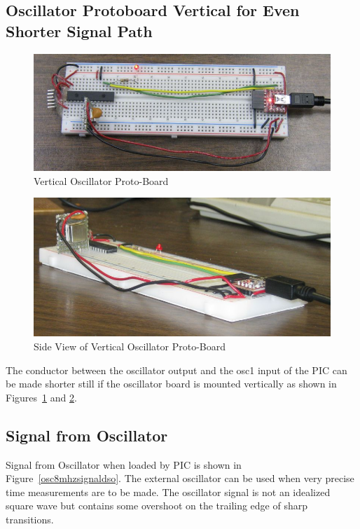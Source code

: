 \documentclass[twocolumn]{article}
\makeatletter
\def\maxwidth{\ifdim\Gin@nat@width>\linewidth\linewidth
\else\Gin@nat@width\fi}
\let\Oldincludegraphics\includegraphics
\renewcommand{\includegraphics}[1]{\Oldincludegraphics[width=\maxwidth]{#1}}
\makeatother
\begin{document}
\subsection{Oscillator Protoboard Vertical for Even Shorter Signal
Path}

\begin{figure}[htbp]
\centering
\includegraphics{phys1600/osc_proto_vert.jpg}
\caption{Vertical Oscillator Proto-Board}
\label{osc8mhzprotopicvert}
\end{figure}

\begin{figure}[htbp]
\centering
\includegraphics{phys1600/osc_proto_pic_vert.jpg}
\caption{Side View of Vertical Oscillator Proto-Board}
\label{osc8mhzprotopicvertside}
\end{figure}

The conductor between the oscillator output and the osc1 input of the PIC can be made shorter still if the oscillator board is mounted vertically as shown in Figures~\ref{osc8mhzprotopicvert} and \ref{osc8mhzprotopicvertside}.

\subsection{Signal from Oscillator}

Signal from Oscillator when loaded by PIC is shown in Figure~\ref{osc8mhzsignaldso}. The external
oscillator can be used when very precise time measurements are to be
made. The oscillator signal is not an idealized square wave but contains some overshoot on the trailing edge of sharp transitions.
\end{document}
